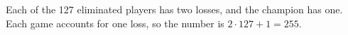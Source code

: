 Each of the 127 eliminated players has two losses, and the champion has one. Each game accounts for one loss, so the number is $ 2\cdot127+1=\boxed{255}$.
